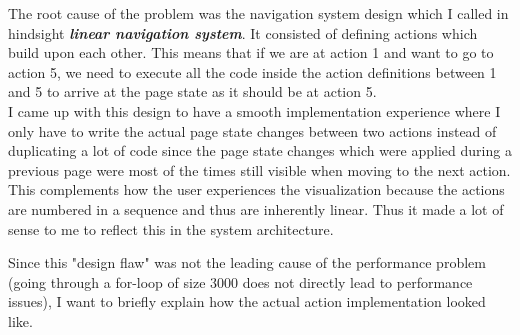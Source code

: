 The root cause of the problem was the navigation system design which I called in hindsight \textbf{\textit{linear navigation system}}. It consisted of defining actions which build upon each other. This means that if we are at action 1 and want to go to action 5, we need to execute all the code inside the action definitions between 1 and 5 to arrive at the page state as it should be at action 5. \\
I came up with this design to have a smooth implementation experience where I only have to write the actual page state changes between two actions instead of duplicating a lot of code since the page state changes which were applied during a previous page were most of the times still visible when moving to the next action. This complements how the user experiences the visualization because the actions are numbered in a sequence and thus are inherently linear. Thus it made a lot of sense to me to reflect this in the system architecture.

\par

Since this "design flaw" was not the leading cause of the performance problem (going through a for-loop of size 3000 does not directly lead to performance issues), I want to briefly explain how the actual action implementation looked like.\\

\par
